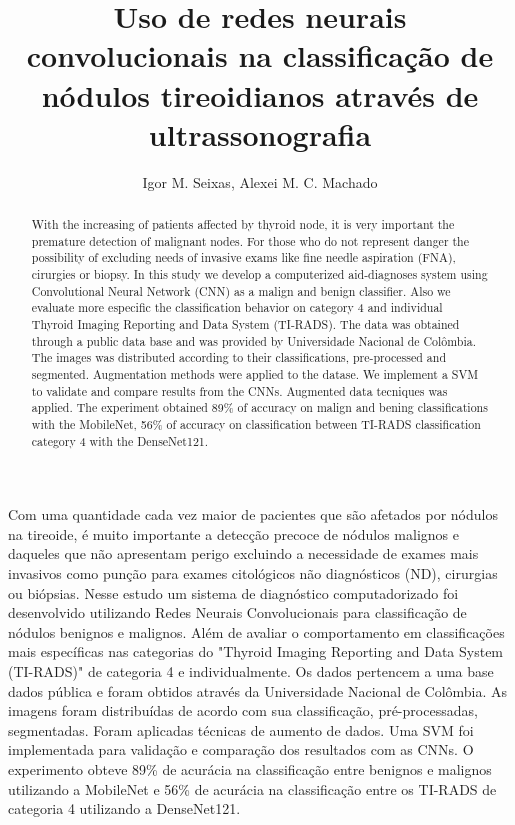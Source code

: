 \documentclass[12pt]{article}
\title{Uso de redes neurais convolucionais na classificação de nódulos tireoidianos através de ultrassonografia}
\author{Igor M. Seixas\inst{1}, Alexei M. C. Machado\inst{1} }
\begin{document}
 

\maketitle

\begin{abstract}
  With the increasing of patients affected by thyroid node, it is very important the premature detection of malignant nodes. For those who do not represent danger the possibility of excluding needs of invasive exams like fine needle aspiration (FNA), cirurgies or biopsy. In this study we develop a computerized aid-diagnoses system using Convolutional Neural Network (CNN) as a malign and benign classifier. Also we evaluate more especific the classification behavior on category 4 and individual Thyroid Imaging Reporting and Data System (TI-RADS). The data was obtained through a public data base and was provided by Universidade Nacional de Colômbia. The images was distributed according to their classifications, pre-processed and segmented. Augmentation methods were applied to the datase. We implement a SVM to validate and compare results from the CNNs. Augmented data tecniques was applied. The experiment obtained 89\% of accuracy on malign and bening classifications with the MobileNet, 56\% of accuracy on classification between TI-RADS classification category 4 with the DenseNet121.
\end{abstract}
     
\begin{resumo} 
  Com uma quantidade cada vez maior de pacientes que são afetados por nódulos na tireoide, é muito importante a detecção precoce de nódulos malignos e daqueles que não apresentam perigo excluindo a necessidade de exames mais invasivos como punção para exames citológicos não diagnósticos (ND), cirurgias ou biópsias. Nesse estudo um sistema de diagnóstico computadorizado foi desenvolvido utilizando Redes Neurais Convolucionais para classificação de nódulos benignos e malignos. Além de avaliar o comportamento em classificações mais específicas nas categorias do "Thyroid Imaging Reporting and Data System (TI-RADS)" de categoria 4 e individualmente. Os dados pertencem a uma base dados pública e foram obtidos através da Universidade Nacional de Colômbia. As imagens foram distribuídas de acordo com sua classificação, pré-processadas, segmentadas. Foram aplicadas técnicas de aumento de dados. Uma SVM foi implementada para validação e comparação dos resultados com as CNNs. O experimento obteve 89\% de acurácia na classificação entre benignos e malignos utilizando a MobileNet e 56\% de acurácia na classificação entre os TI-RADS de categoria 4 utilizando a DenseNet121.
\end{resumo}
\end{document}
